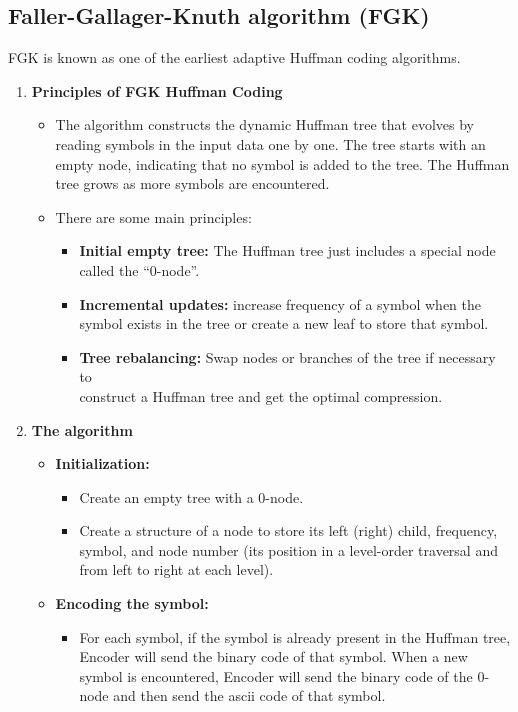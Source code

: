 \subsection{Faller-Gallager-Knuth algorithm (FGK)}
FGK is known as one of the earliest adaptive Huffman coding algorithms.
\begin{enumerate}[label=\textbf{\Alph*.}]
    \item \textbf{Principles of FGK Huffman Coding}
    \begin{itemize}
        \item The algorithm constructs the dynamic Huffman tree that evolves by reading symbols in the input data one by one. The tree starts with an empty node, indicating that no symbol is added to the tree. The Huffman tree grows as more symbols are encountered.
        \item There are some main principles:
        \begin{itemize}
            \item \textbf{Initial empty tree:} The Huffman tree just includes a special node called the “0-node”.
            \item \textbf{Incremental updates:}  increase frequency of a symbol when the symbol exists in the tree or create a new leaf to store that symbol.
            \item \textbf{Tree rebalancing:} Swap nodes or branches of the tree if necessary to \\construct a Huffman tree and get the optimal compression.
        \end{itemize}
    \end{itemize}
    \item \textbf{The algorithm}
    \begin{itemize}
        \item \textbf{Initialization:}
        \begin{itemize}
            \item Create an empty tree with a 0-node.
            \item Create a structure of a node to store its left (right) child, frequency, symbol, and node number (its position in a level-order traversal and from left to right at each level).
        \end{itemize}
        \item \textbf{Encoding the symbol:}
        \begin{itemize}
           \item For each symbol, if the symbol is already present in the Huffman tree, Encoder will send the binary code of that symbol. When a new symbol is encountered, Encoder will send the binary code of the 0-node and then send the ascii code of that symbol.

\end{itemize}
\end{itemize}
\end{enumerate}
